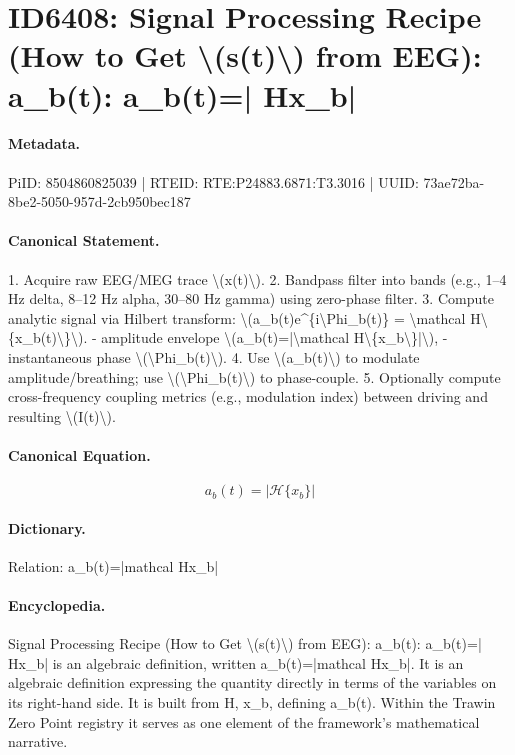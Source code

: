 \section*{ID6408: Signal Processing Recipe (How to Get \textbackslash{}(s(t)\textbackslash{}) from EEG): a\_b(t): a\_b(t)=| Hx\_b|}
\paragraph{Metadata.}
PiID: 8504860825039 | RTEID: RTE:P24883.6871:T3.3016 | UUID: 73ae72ba-8be2-5050-957d-2cb950bec187

\paragraph{Canonical Statement.}
1. Acquire raw EEG/MEG trace \textbackslash{}(x(t)\textbackslash{}). 2. Bandpass filter into bands (e.g., 1–4 Hz delta, 8–12 Hz alpha, 30–80 Hz gamma) using zero-phase filter. 3. Compute analytic signal via Hilbert transform: \textbackslash{}(a\_b(t)e\textasciicircum{}\{i\textbackslash{}Phi\_b(t)\} = \textbackslash{}mathcal H\textbackslash{}\{x\_b(t)\textbackslash{}\}\textbackslash{}). - amplitude envelope \textbackslash{}(a\_b(t)=|\textbackslash{}mathcal H\textbackslash{}\{x\_b\textbackslash{}\}|\textbackslash{}), - instantaneous phase \textbackslash{}(\textbackslash{}Phi\_b(t)\textbackslash{}). 4. Use \textbackslash{}(a\_b(t)\textbackslash{}) to modulate amplitude/breathing; use \textbackslash{}(\textbackslash{}Phi\_b(t)\textbackslash{}) to phase-couple. 5. Optionally compute cross-frequency coupling metrics (e.g., modulation index) between driving and resulting \textbackslash{}(I(t)\textbackslash{}).

\paragraph{Canonical Equation.}
\[
a_b(t)=|\mathcal H\{x_b\}|
\]

\paragraph{Dictionary.}
Relation: a\_b(t)=|mathcal Hx\_b|

\paragraph{Encyclopedia.}
Signal Processing Recipe (How to Get \textbackslash{}(s(t)\textbackslash{}) from EEG): a\_b(t): a\_b(t)=| Hx\_b| is an algebraic definition, written a\_b(t)=|mathcal Hx\_b|. It is an algebraic definition expressing the quantity directly in terms of the variables on its right-hand side. It is built from H, x\_b, defining a\_b(t). Within the Trawin Zero Point registry it serves as one element of the framework's mathematical narrative.

